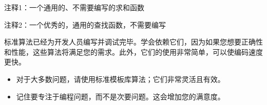 {\footnotesize
注释1：一个通用的、不需要编写的求和函数

注释2：一个优秀的，通用的查找函数，不需要编写
}

标准算法已经为开发人员编写并调试完毕。学会依赖它们，因为如果您想要正确性和性能，这些算法将满足您的需求。此外，它们的使用非常简单，可以使编码速度更快。


\begin{itemize}
\item
对于大多数问题，请使用标准模板库算法；它们非常灵活且有效。

\item
记住要专注于编程问题，而不是次要问题。这会增加您的满意度。
\end{itemize}




